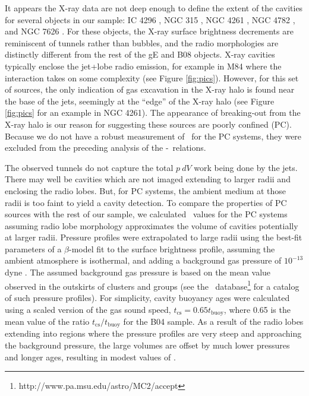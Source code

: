 \documentclass{emulateapj}
\begin{document}
It appears the X-ray data are not deep enough to define the extent of
the cavities for several objects in our sample: IC 4296
\citep{1988ApJ...324..198K, 2003ApJ...585..677P}, NGC 315
\citep{1979ApJ...228L...9B, 1981A&A....95..250W}, NGC 4261
\citep{1997ApJ...484..186J, 2000ApJ...534..165J}, NGC 4782
\citep{2007ApJ...664..804M}, and NGC 7626 \citep{1985ApJ...291...32B}.
For these objects, the X-ray surface brightness decrements are
reminiscent of tunnels rather than bubbles, and the radio morphologies
are distinctly different from the rest of the gE and B08
objects. X-ray cavities typically enclose the jet+lobe radio emission,
for example in M84 \citep{2001ApJ...547L.107F, 2008ApJ...686..911F}
where the interaction takes on some complexity (see Figure
\ref{fig:pics}). However, for this set of sources, the only indication
of gas excavation in the X-ray halo is found near the base of the
jets, seemingly at the ``edge'' of the X-ray halo (see Figure
\ref{fig:pics} for an example in NGC 4261). The appearance of
breaking-out from the X-ray halo is our reason for suggesting these
sources are poorly confined (PC). Because we do not have a robust
measurement of \pcav\ for the PC systems, they were excluded from the
preceding analysis of the \pjet-\prad\ relations.

The observed tunnels do not capture the total $p~dV$ work being done
by the jets. There may well be cavities which are not imaged extending
to larger radii and enclosing the radio lobes. But, for PC systems,
the ambient medium at those radii is too faint to yield a cavity
detection. To compare the properties of PC sources with the rest of
our sample, we calculated \pcav\ values for the PC systems assuming
radio lobe morphology approximates the volume of cavities potentially
at larger radii. Pressure profiles were extrapolated to large radii
using the best-fit parameters of a $\beta$-model \citep{betamodel} fit
to the surface brightness profile, assuming the ambient atmosphere is
isothermal, and adding a background gas pressure of $10^{-13}$ dyne
\pcmsq. The assumed background gas pressure is based on the mean value
observed in the outskirts of clusters and groups (see the
\accept\ database\footnote{http://www.pa.msu.edu/astro/MC2/accept} for
a catalog of such pressure profiles). For simplicity, cavity buoyancy
ages were calculated using a scaled version of the gas sound speed,
$t_{\mathrm{cs}} = 0.65 t_{\mathrm{buoy}}$, where 0.65 is the mean
value of the ratio $t_{\mathrm{cs}}/t_{\mathrm{buoy}}$ for the B04
sample. As a result of the radio lobes extending into regions where
the pressure profiles are very steep and approaching the background
pressure, the large volumes are offset by much lower pressures and
longer ages, resulting in modest values of \pcav.
\end{document}
